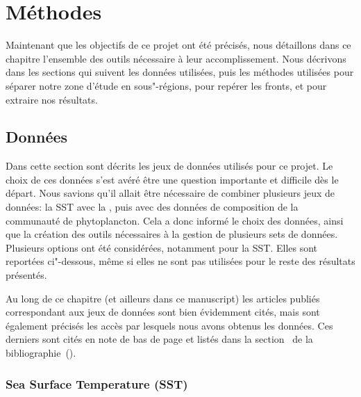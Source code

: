 
\chapter{Méthodes}
\addChpLof
\label{chp:methodes}
\graphicspath{{resources/méthodes}}

\minitoc%
\clearpage

Maintenant que les objectifs de ce projet ont été précisés, nous détaillons dans ce chapitre l'ensemble des outils nécessaire à leur accomplissement.
Nous décrivons dans les sections qui suivent les données utilisées, puis les méthodes utilisées pour séparer notre zone d'étude en sous"-régions, pour repérer les fronts, et pour extraire nos résultats.

\section{Données}
\label{sec:donnees}

Dans cette section sont décrits les jeux de données utilisés pour ce projet.
Le choix de ces données s'est avéré être une question importante et difficile dès le départ.
Nous savions qu'il allait être nécessaire de combiner plusieurs jeux de données: la SST avec la , puis avec des données de composition de la communauté de phytoplancton.
Cela a donc informé le choix des données, ainsi que la création des outils nécessaires à la gestion de plusieurs sets de données.
Plusieurs options ont été considérées, notamment pour la SST.
Elles sont reportées ci"-dessous, même si elles ne sont pas utilisées pour le reste des résultats présentés.

Au long de ce chapitre (et ailleurs dans ce manuscript) les articles publiés correspondant aux jeux de données sont bien évidemment cités, mais sont également précisés les accès par lesquels nous avons obtenus les données.
Ces derniers sont cités en note de bas de page et listés dans la section~ de la bibliographie~().

\subsection{Sea Surface Temperature (SST)}
\label{sec:donnees-sst}

